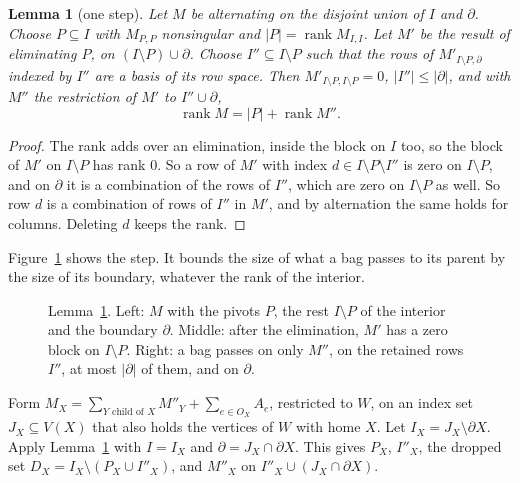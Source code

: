 \documentclass[11pt]{article}
\newtheorem{lemma}[theorem]{Lemma}
\theoremstyle{definition}
\theoremstyle{remark}
\theoremstyle{plain}
\newcommand{\AlgElim}{\textsc{BagElimination}}
\newcommand{\rank}{\operatorname{rank}}
\begin{document}
\begin{lemma}[one step]\label{lem:onestep}
Let $M$ be alternating on the disjoint union of $I$ and $\partial$. Choose $P\subseteq I$ with $M_{P,P}$ nonsingular and $|P|=\rank M_{I,I}$. Let
$M'$ be the result of eliminating $P$, on $(I\setminus P)\cup\partial$. Choose $I''\subseteq I\setminus P$ such that the rows of
$M'_{I\setminus P,\partial}$ indexed by $I''$ are a basis of its row space. Then $M'_{I\setminus P,I\setminus P}=0$, $|I''|\le|\partial|$, and with $M''$
the restriction of $M'$ to $I''\cup\partial$,
\[
\rank M=|P|+\rank M''.
\]
\end{lemma}
\begin{proof}
The rank adds over an elimination, inside the block on $I$ too, so the block of $M'$ on $I\setminus P$ has rank $0$. So a row of $M'$ with index
$d\in I\setminus P\setminus I''$ is zero on $I\setminus P$, and on $\partial$ it is a combination of the rows of $I''$, which are zero on $I\setminus P$ as well.
So row $d$ is a combination of rows of $I''$ in $M'$, and by alternation the same holds for columns. Deleting $d$ keeps the rank.
\end{proof}

Figure~\ref{fig:step} shows the step. It bounds the size of what a bag passes to its parent by the size of its boundary,
whatever the rank of the interior.

\begin{figure}[t]
\centering

\caption{Lemma~\ref{lem:onestep}. Left: $M$ with the pivots $P$, the rest $I\setminus P$ of the interior and the boundary
$\partial$. Middle: after the elimination, $M'$ has a zero block on $I\setminus P$. Right: a bag passes on only $M''$, on the
retained rows $I''$, at most $|\partial|$ of them, and on $\partial$.}
\label{fig:step}
\end{figure}

\begin{algorithm}[t]
\caption{\AlgElim{}$(W)$}\label{alg:elim}
\begin{algorithmic}[1]
  \State Form $M_X=\sum_{Y\text{ child of }X}M''_Y+\sum_{e\in O_X}A_e$, restricted to $W$, on an index set $J_X\subseteq V(X)$ that also holds
  the vertices of $W$ with home $X$. Let $I_X=J_X\setminus\partial X$.
  \State Apply Lemma~\ref{lem:onestep} with $I=I_X$ and $\partial=J_X\cap\partial X$. This gives $P_X$, $I''_X$, the dropped set
  $D_X=I_X\setminus(P_X\cup I''_X)$, and $M''_X$ on $I''_X\cup(J_X\cap\partial X)$.
\EndFor
\end{algorithmic}
\end{algorithm}
\end{document}
